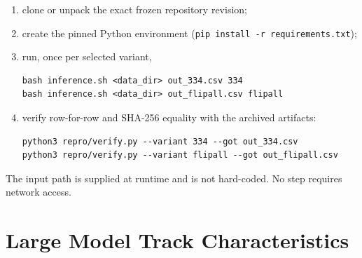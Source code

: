 \documentclass[12pt,a4paper]{article}
\begin{document}
\begin{enumerate}
    \item clone or unpack the exact frozen repository revision;
    \item create the pinned Python environment (\texttt{pip install -r requirements.txt});
    \item run, once per selected variant,
\begin{verbatim}
bash inference.sh <data_dir> out_334.csv 334
bash inference.sh <data_dir> out_flipall.csv flipall
\end{verbatim}
    \item verify row-for-row and SHA-256 equality with the archived artifacts:
\begin{verbatim}
python3 repro/verify.py --variant 334 --got out_334.csv
python3 repro/verify.py --variant flipall --got out_flipall.csv
\end{verbatim}
\end{enumerate}

The input path is supplied at runtime and is not hard-coded. No step requires
network access.

\section{Large Model Track Characteristics}
\end{document}
